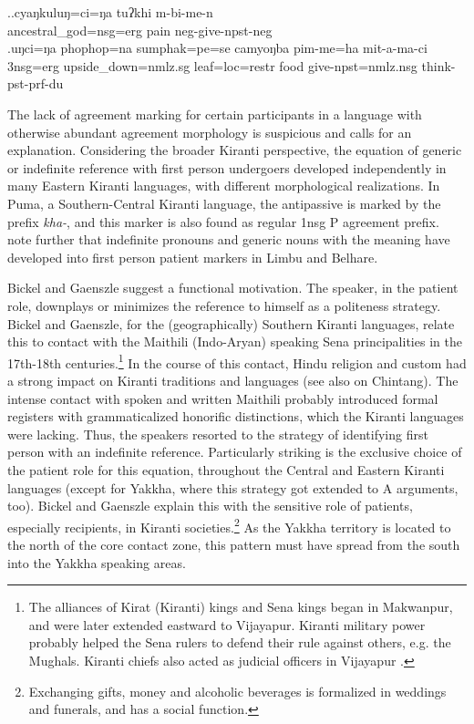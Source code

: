\ex.\ag.cyaŋkuluŋ=ci=ŋa     tuʔkhi m-bi-me-n\\
ancestral\_god{\sc =nsg=erg} pain {\sc neg-}give{\sc [3A;1.P]-npst-neg}\\
\bg.uŋci=ŋa   phophop=na  sumphak=pe=se   camyoŋba pim-me=ha mit-a-ma-ci\\
{\sc 3nsg=erg} upside\_down{\sc =nmlz.sg} leaf{\sc =loc=restr} food  give{\sc [3A;1.P]-npst=nmlz.nsg} think{\sc -pst-prf-du}\\


The lack of agreement marking for certain participants in a language with otherwise abundant agreement morphology is suspicious and calls for an explanation. Considering the broader Kiranti perspective, the equation of generic or indefinite reference with first person undergoers developed independently in many Eastern Kiranti languages, with different morphological realizations. In Puma, a Southern-Central Kiranti language, the antipassive is marked by the prefix \emph{kha-}, and this marker is also found as regular 1nsg P agreement prefix.  \citet[6]{Bickeletal2005Generics} note further that indefinite pronouns and generic nouns with the meaning  have developed into first person patient markers in Limbu and Belhare. 

Bickel and Gaenszle suggest a functional motivation. The speaker, in the patient role, downplays or minimizes the reference to himself as a politeness strategy.  Bickel and Gaenszle, for the (geographically) Southern Kiranti languages, relate this to contact with the Maithili (Indo-Aryan) speaking Sena principalities in the 17th-18th centuries.\footnote{The alliances of Kirat (Kiranti) kings and Sena kings began in Makwanpur, and were later extended eastward to Vijayapur. Kiranti military power probably helped the Sena rulers to defend their rule against others, e.g. the Mughals. Kiranti chiefs also acted as judicial officers in Vijayapur \citep[76]{Pradhan1991The-Gorkha}.} In the course of this contact, Hindu religion and custom had a strong impact on Kiranti traditions and languages (see also \citet{Gaenszleetal2005Worshipping} on Chintang). The intense contact with  spoken and written Maithili probably introduced formal registers with grammaticalized honorific distinctions, which the Kiranti languages were lacking. Thus, the speakers resorted to the strategy of identifying first person with an indefinite reference. Particularly striking is  the exclusive choice of the patient role for this equation, throughout the Central and Eastern Kiranti languages (except for Yakkha, where this strategy got extended to A arguments, too). Bickel and Gaenszle explain this with the sensitive role of patients, especially recipients, in Kiranti societies.\footnote{Exchanging gifts, money and alcoholic beverages is formalized in weddings and funerals, and has a social function.} As the Yakkha territory is located to the north of the core contact zone, this pattern must have spread from the south into the Yakkha speaking areas.


